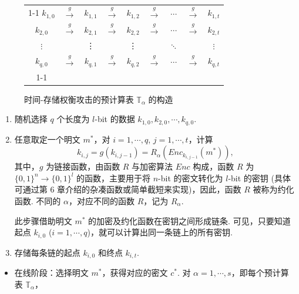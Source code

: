\documentclass[12pt,a4paper]{article}
\begin{document}
\begin{figure}[htbp]
    \centering
    \setlength{\tabcolsep}{2pt}
    \begin{tabular}{|c|ccccccc|c|}
        \cline{1-1} \cline{9-9}
        $k_{1,0}$ & $\xrightarrow{g}$ & $k_{1,1}$ & $\xrightarrow{g}$ & $k_{1,2}$ & $\xrightarrow{g}$ & $\cdots$ & $\xrightarrow{g}$ & $k_{1,t}$ \\
        $k_{2,0}$ & $\xrightarrow{g}$ & $k_{2,1}$ & $\xrightarrow{g}$ & $k_{2,2}$ & $\xrightarrow{g}$ & $\cdots$ & $\xrightarrow{g}$ & $k_{2,t}$ \\
        $\vdots$ & & \vdots & & \vdots & & $\ddots$ & & $\vdots$ \\
        $k_{q,0}$ & $\xrightarrow{g}$ & $k_{q,1}$ & $\xrightarrow{g}$ & $k_{q,2}$ & $\xrightarrow{g}$ & $\cdots$ & $\xrightarrow{g}$ & $k_{q,t}$ \\
        \cline{1-1} \cline{9-9}
    \end{tabular}
    \caption{时间-存储权衡攻击的预计算表 $\mathbb{T}_\alpha$ 的构造}
\end{figure}

\begin{enumerate}
    \item 随机选择 $q$ 个长度为 $l$-bit 的数据 $k_{1,0}, k_{2,0}, \cdots, k_{q,0}$.
    \item 任意取定一个明文 $m^*$，对 $i = 1, \cdots, q$, $j = 1, \cdots, t$，计算
    $$k_{i,j} = g(k_{i,j-1}) = R_\alpha(Enc_{k_{i,j-1}}(m^*)),$$
    其中，$g$ 为链接函数，由函数 $R$ 与加密算法 $Enc$ 构成，函数 $R$ 为 $\{0, 1\}^n \to \{0, 1\}^l$ 的函数，主要用于将 $n$-bit 的密文转化为 $l$-bit 的密钥 (具体可通过第 6 章介绍的杂凑函数或简单截短来实现)，因此，函数 $R$ 被称为约化函数. 不同的 $\alpha$，对应不同的函数 $R$，记为 $R_\alpha$.

    此步骤借助明文 $m^*$ 的加密及约化函数在密钥之间形成链条. 可见，只要知道起点 $k_{i,0}$ ($i = 1, \cdots, q$)，就可以计算出同一条链上的所有密钥.
    
    \item 存储每条链的起点 $k_{i,0}$ 和终点 $k_{i,t}$\footnotemark[1].
\end{enumerate}


\begin{itemize}
    \item 在线阶段：选择明文 $m^*$，获得对应的密文 $c^*$. 对 $\alpha = 1, \cdots, s$，即每个预计算表 $\mathbb{T}_\alpha$，
\end{itemize}
\end{document}
